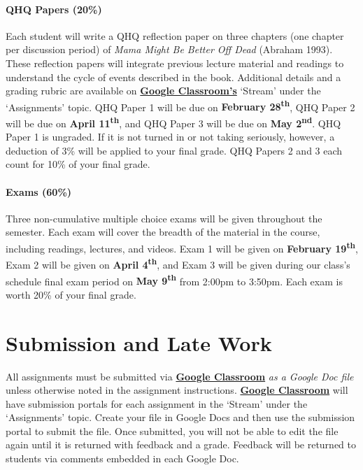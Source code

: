 \documentclass{tufte-book}
\begin{document}
\paragraph{QHQ Papers (20\%)} 
Each student will write a QHQ reflection paper on three chapters (one chapter per discussion period) of \textit{Mama Might Be Better Off Dead} (Abraham 1993). These reflection papers will integrate previous lecture material and readings to understand the cycle of events described in the book. Additional details and a grading rubric are available on \textbf{\href{https://classroom.google.com}{Google Classroom's}} `Stream' under the `Assignments' topic. QHQ Paper 1 will be due on \textbf{February 28\textsuperscript{th}}, QHQ Paper 2 will be due on \textbf{April 11\textsuperscript{th}}, and QHQ Paper 3 will be due on \textbf{May 2\textsuperscript{nd}}. QHQ Paper 1 is ungraded. If it is not turned in or not taking seriously, however, a deduction of 3\% will be applied to your final grade. QHQ Papers 2 and 3 each count for 10\% of your final grade.

\paragraph{Exams (60\%)}
Three non-cumulative multiple choice exams will be given throughout the semester. Each exam will cover the breadth of the material in the course, including readings, lectures, and videos. Exam 1 will be given on \textbf{February 19\textsuperscript{th}}, Exam 2 will be given on \textbf{April 4\textsuperscript{th}}, and Exam 3 will be given during our class’s schedule final exam period on \textbf{May 9\textsuperscript{th}} from 2:00pm to 3:50pm. Each exam is worth 20\% of your final grade.

\vspace{3mm}
\section{Submission and Late Work}
\par All assignments must be submitted via \textbf{\href{https://classroom.google.com}{Google Classroom}} \textit{as a Google Doc file} unless otherwise noted in the assignment instructions. \textbf{\href{https://classroom.google.com}{Google Classroom}} will have submission portals for each assignment in the `Stream' under the `Assignments' topic. Create your file in Google Docs and then use the submission portal to submit the file. Once submitted, you will not be able to edit the file again until it is returned with feedback and a grade. Feedback will be returned to students via comments embedded in each Google Doc.
\end{document}
